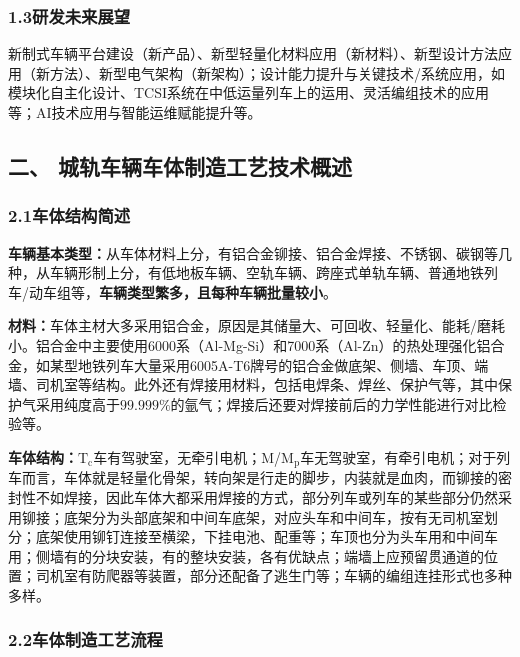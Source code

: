 \documentclass[12pt, oneside, a4paper]{ctexart}
\begin{document}
\newpage
\journalpage
\vspace{-7.5mm}\subsubsection*{1.3\quad{}研发未来展望}\vspace{-2mm}
新制式车辆平台建设（新产品）、新型轻量化材料应用（新材料）、新型设计方法应用（新方法）、新型电气架构（新架构）；设计能力提升与关键技术/系统应用，如模块化自主化设计、TCSI系统在中低运量列车上的运用、灵活编组技术的应用等；AI技术应用与智能运维赋能提升等。\par{}
\vspace{-5mm}\subsection*{二、 城轨车辆车体制造工艺技术概述}
\vspace{-2mm}\subsubsection*{2.1\quad{}车体结构简述}\vspace{-2mm}
{\bf{}车辆基本类型：}从车体材料上分，有铝合金铆接、铝合金焊接、不锈钢、碳钢等几种，从车辆形制上分，有低地板车辆、空轨车辆、跨座式单轨车辆、普通地铁列车/动车组等，{\bf{}车辆类型繁多，且每种车辆批量较小}。\par{}
{\bf{}材料：}车体主材大多采用铝合金，原因是其储量大、可回收、轻量化、能耗/磨耗小。铝合金中主要使用6000系（Al-Mg-Si）和7000系（Al-Zn）的热处理强化铝合金，如某型地铁列车大量采用6005A-T6牌号的铝合金做底架、侧墙、车顶、端墙、司机室等结构。此外还有焊接用材料，包括电焊条、焊丝、保护气等，其中保护气采用纯度高于$99.999\%$的氩气；焊接后还要对焊接前后的力学性能进行对比检验等。\par{}
{\bf{}车体结构：}$\mathrm{T_c}$车有驾驶室，无牵引电机；$\mathrm{M}$/$\mathrm{M_p}$车无驾驶室，有牵引电机；对于列车而言，车体就是轻量化骨架，转向架是行走的脚步，内装就是血肉，而铆接的密封性不如焊接，因此车体大都采用焊接的方式，部分列车或列车的某些部分仍然采用铆接；底架分为头部底架和中间车底架，对应头车和中间车，按有无司机室划分；底架使用铆钉连接至横梁，下挂电池、配重等；车顶也分为头车用和中间车用；侧墙有的分块安装，有的整块安装，各有优缺点；端墙上应预留贯通道的位置；司机室有防爬器等装置，部分还配备了逃生门等；车辆的编组连挂形式也多种多样。\par{}
\vspace{-5mm}\subsubsection*{2.2\quad{}车体制造工艺流程}\vspace{-2mm}
\end{document}
